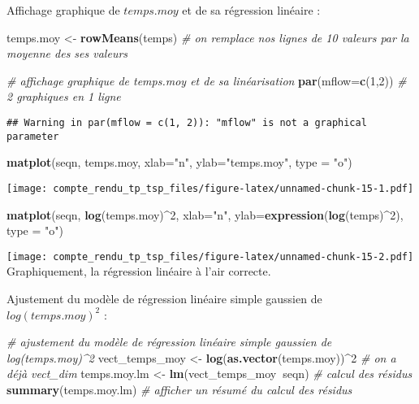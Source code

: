 \documentclass[
]{article}
\newenvironment{Shaded}{\begin{snugshade}}{\end{snugshade}}
\newcommand{\CommentTok}[1]{\textcolor[rgb]{0.56,0.35,0.01}{\textit{#1}}}
\newcommand{\DataTypeTok}[1]{\textcolor[rgb]{0.13,0.29,0.53}{#1}}
\newcommand{\DecValTok}[1]{\textcolor[rgb]{0.00,0.00,0.81}{#1}}
\newcommand{\KeywordTok}[1]{\textcolor[rgb]{0.13,0.29,0.53}{\textbf{#1}}}
\newcommand{\NormalTok}[1]{#1}
\newcommand{\OperatorTok}[1]{\textcolor[rgb]{0.81,0.36,0.00}{\textbf{#1}}}
\newcommand{\StringTok}[1]{\textcolor[rgb]{0.31,0.60,0.02}{#1}}
\begin{document}
Affichage graphique de \(temps.moy\) et de sa régression linéaire :

\begin{Shaded}
\begin{Highlighting}[]
\NormalTok{temps.moy <-}\StringTok{ }\KeywordTok{rowMeans}\NormalTok{(temps) }\CommentTok{# on remplace nos lignes de 10 valeurs par la moyenne des ses valeurs}

\CommentTok{# affichage graphique de temps.moy et de sa linéarisation}
\KeywordTok{par}\NormalTok{(}\DataTypeTok{mflow=}\KeywordTok{c}\NormalTok{(}\DecValTok{1}\NormalTok{,}\DecValTok{2}\NormalTok{)) }\CommentTok{# 2 graphiques en 1 ligne}
\end{Highlighting}
\end{Shaded}

\begin{verbatim}
## Warning in par(mflow = c(1, 2)): "mflow" is not a graphical parameter
\end{verbatim}

\begin{Shaded}
\begin{Highlighting}[]
\KeywordTok{matplot}\NormalTok{(seqn, temps.moy, }\DataTypeTok{xlab=}\StringTok{"n"}\NormalTok{, }\DataTypeTok{ylab=}\StringTok{"temps.moy"}\NormalTok{, }\DataTypeTok{type =} \StringTok{"o"}\NormalTok{)}
\end{Highlighting}
\end{Shaded}

\texttt{[image: compte\_rendu\_tp\_tsp\_files/figure-latex/unnamed-chunk-15-1.pdf]}

\begin{Shaded}
\begin{Highlighting}[]
\KeywordTok{matplot}\NormalTok{(seqn, }\KeywordTok{log}\NormalTok{(temps.moy)}\OperatorTok{^}\DecValTok{2}\NormalTok{, }\DataTypeTok{xlab=}\StringTok{"n"}\NormalTok{, }\DataTypeTok{ylab=}\KeywordTok{expression}\NormalTok{(}\KeywordTok{log}\NormalTok{(temps)}\OperatorTok{^}\DecValTok{2}\NormalTok{), }\DataTypeTok{type =} \StringTok{"o"}\NormalTok{)}
\end{Highlighting}
\end{Shaded}

\texttt{[image: compte\_rendu\_tp\_tsp\_files/figure-latex/unnamed-chunk-15-2.pdf]}
Graphiquement, la régression linéaire à l'air correcte.

Ajustement du modèle de régression linéaire simple gaussien de
\(log(temps.moy)^2\) :

\begin{Shaded}
\begin{Highlighting}[]
\CommentTok{# ajustement du modèle de régression linéaire simple gaussien de log(temps.moy)^2}
\NormalTok{vect_temps_moy <-}\StringTok{ }\KeywordTok{log}\NormalTok{(}\KeywordTok{as.vector}\NormalTok{(temps.moy))}\OperatorTok{^}\DecValTok{2}
\CommentTok{# on a déjà vect_dim}
\NormalTok{temps.moy.lm <-}\StringTok{ }\KeywordTok{lm}\NormalTok{(vect_temps_moy}\OperatorTok{~}\NormalTok{seqn) }\CommentTok{# calcul des résidus}
\KeywordTok{summary}\NormalTok{(temps.moy.lm) }\CommentTok{# afficher un résumé du calcul des résidus}
\end{Highlighting}
\end{Shaded}
\end{document}
